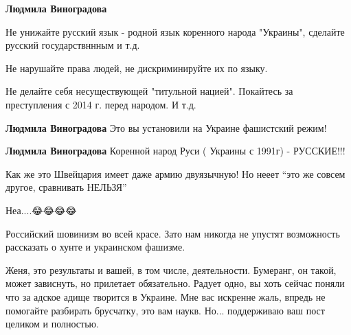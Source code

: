 \begin{itemize}
\begin{itemize}
\textbf{Людмила Виноградова} 

Не унижайте русский язык - родной язык коренного народа "Украины", сделайте
русский государствннным и т.д.

Не нарушайте права людей, не дискриминируйте их по языку.

Не делайте себя несуществующей "титульной нацией". Покайтесь за преступления с
2014 г. перед народом. И т.д.


\textbf{Людмила Виноградова} Это вы установили на Украине фашистский режим!


\textbf{Людмила Виноградова} Коренной народ Руси ( Украины с 1991г) - РУССКИЕ!!!

\end{itemize}



Как же это Швейцария имеет даже армию двуязычную! Но нееет \enquote{это же совсем
другое, сравнивать НЕЛЬЗЯ}

\begin{itemize}

Неа....😂😂😂😂
\end{itemize}


Российский шовинизм во всей красе. Зато нам никогда не упустят возможность
рассказать о хунте и украинском фашизме.




Женя, это результаты и вашей, в том числе, деятельности. Бумеранг, он такой,
может зависнуть, но прилетает обязательно. Радует одно, вы хоть сейчас поняли
что за адское адище творится в Украине. Мне вас искренне жаль, впредь не
помогайте разбирать брусчатку, это вам наукв. Но... поддерживаю ваш пост
целиком и полностью.




\end{itemize}
